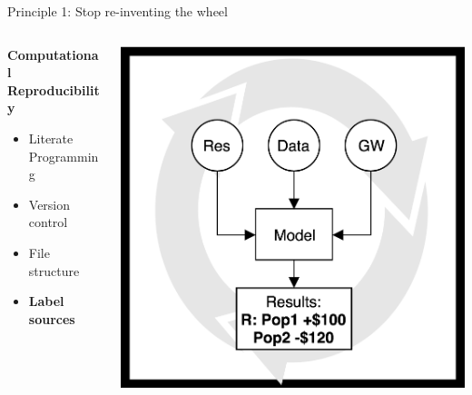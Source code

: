 \documentclass{beamer}
\begin{document}
\begin{frame}{Principle 1: Stop re-inventing the wheel}
\begin{columns}
\begin{column}{0.3\textwidth}
\textbf{Computational Reproducibility}
\begin{itemize}
\item Literate \\ Programming
\item Version control
\item File structure
\item \textbf{Label sources}
\end{itemize}
\end{column}
\begin{column}{0.65\textwidth}  %
    \begin{center}
     \includegraphics[width=1\textwidth]{../Images/repro.png}
     \end{center}
\end{column}
\end{columns}
\end{frame}
\end{document}
